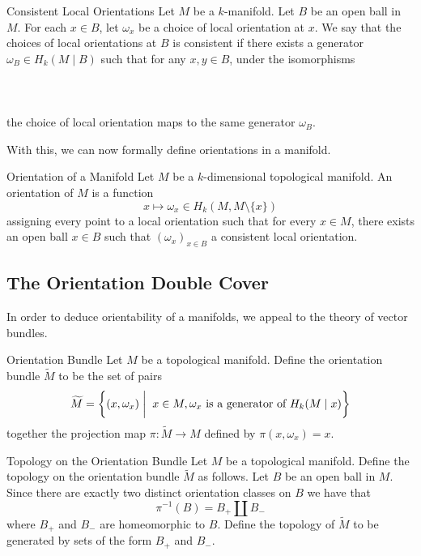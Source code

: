\documentclass[a4paper]{article}
\begin{document}
\begin{defn}{Consistent Local Orientations}{} Let $M$ be a $k$-manifold. Let $B$ be an open ball in $M$. For each $x\in B$, let $\omega_x$ be a choice of local orientation at $x$. We say that the choices of local orientations at $B$ is consistent if there exists a generator $\omega_B\in H_k(M\;|\; B)$ such that for any $x,y\in B$, under the isomorphisms \\~\\
\\~\\
the choice of local orientation maps to the same generator $\omega_B$. 
\end{defn}

With this, we can now formally define orientations in a manifold. 

\begin{defn}{Orientation of a Manifold}{} Let $M$ be a $k$-dimensional topological manifold. An orientation of $M$ is a function $$x\mapsto\omega_x\in H_k(M,M\setminus\{x\})$$ assigning every point to a local orientation such that for every $x\in M$, there exists an open ball $x\in B$ such that $(\omega_x)_{x\in B}$ a consistent local orientation. 
\end{defn}

\subsection{The Orientation Double Cover}
In order to deduce orientability of a manifolds, we appeal to the theory of vector bundles. 

\begin{defn}{Orientation Bundle}{} Let $M$ be a topological manifold. Define the orientation bundle $\widetilde{M}$ to be the set of pairs $$\widetilde{M}=\left\{(x,\omega_x)\;\bigg{|}\;\; x\in M, \omega_x\text{ is a generator of }H_k(M\;|\; x)\right\}$$ together the projection map $\pi:\widetilde{M}\to M$ defined by $\pi(x,\omega_x)=x$. 
\end{defn}

\begin{defn}{Topology on the Orientation Bundle}{} Let $M$ be a topological manifold. Define the topology on the orientation bundle $\widetilde{M}$ as follows. Let $B$ be an open ball in $M$. Since there are exactly two distinct orientation classes on $B$ we have that $$\pi^{-1}(B)=B_+\amalg B_-$$ where $B_+$ and $B_-$ are homeomorphic to $B$. Define the topology of $\widetilde{M}$ to be generated by sets of the form $B_+$ and $B_-$. 
\end{defn}
\end{document}
